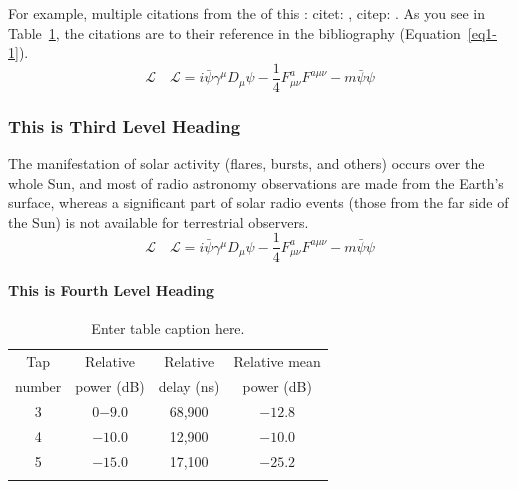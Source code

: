 For example, multiple citations from the  of this :
citet: \citet{CR9,CR6}, citep: \citep{CR9,CR6}.
As you see in Table~\ref{tab1-1}, the citations are  to their
reference in the bibliography (Equation~\ref{eq1-1}).
\begin{equation}
\mathcal{L}\quad \mathbf{\mathcal{L}} = i \bar{\psi} \gamma^\mu D_\mu \psi - 
\frac{1}{4} F_{\mu\nu}^a F^{a\mu\nu} - m \bar{\psi} \psi\label{eq1-1}
\end{equation}

\subsubsection{This is Third Level Heading}

The manifestation of solar activity (flares, bursts, and others) occurs over the whole Sun, and most of radio astronomy observations are made from the Earth's surface, whereas a significant part of solar radio events (those from the far side of the Sun) is not available for terrestrial observers.
\begin{equation}
\mathcal{L}\quad \mathbf{\mathcal{L}} = i \bar{\psi} \gamma^\mu D_\mu \psi - 
\frac{1}{4} F_{\mu\nu}^a F^{a\mu\nu} - m \bar{\psi} \psi\label{eq1-2}
\end{equation}

\paragraph{This is Fourth Level Heading}

\lipsum[5]

\begin{table}
\caption{Enter table caption here.\label{tab1-1}}{%
\begin{tabular}{@{}cccc@{}}
\toprule
Tap     &Relative   &Relative   &Relative mean\\
number  &power (dB) &delay (ns) &power (dB)\\
\midrule
3 &0$-9.0$  &68,900\footnotemark[1] &$-12.8$\\
4 &$-10.0$ &12,900\footnotemark[2] &$-10.0$\\
5 &$-15.0$ &17,100 &$-25.2$\\
\botrule
\end{tabular}}{
}
\end{table}

